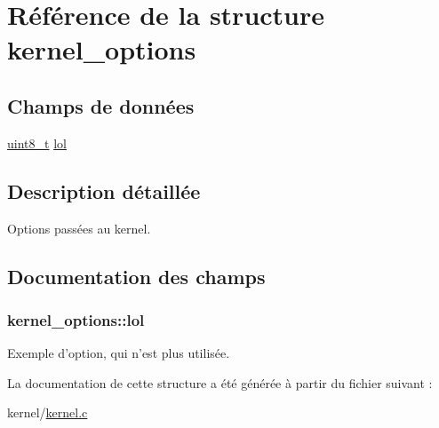 \hypertarget{structkernel__options}{\section{Référence de la structure kernel\-\_\-options}
\label{structkernel__options}
}
\subsection*{Champs de données}
\begin{DoxyCompactItemize}
\item 
\hyperlink{types_8h_aba7bc1797add20fe3efdf37ced1182c5}{uint8\-\_\-t} \hyperlink{structkernel__options_aaf8b5378f13106d9ddbc9e392e7f0367}{lol}
\end{DoxyCompactItemize}


\subsection{Description détaillée}
Options passées au kernel. 

\subsection{Documentation des champs}
\hypertarget{structkernel__options_aaf8b5378f13106d9ddbc9e392e7f0367}{
\subsubsection[{lol}]{ kernel\-\_\-options\-::lol}}\label{structkernel__options_aaf8b5378f13106d9ddbc9e392e7f0367}
Exemple d'option, qui n'est plus utilisée. 

La documentation de cette structure a été générée à partir du fichier suivant \-:\begin{DoxyCompactItemize}
\item 
kernel/\hyperlink{kernel_8c}{kernel.\-c}\end{DoxyCompactItemize}
